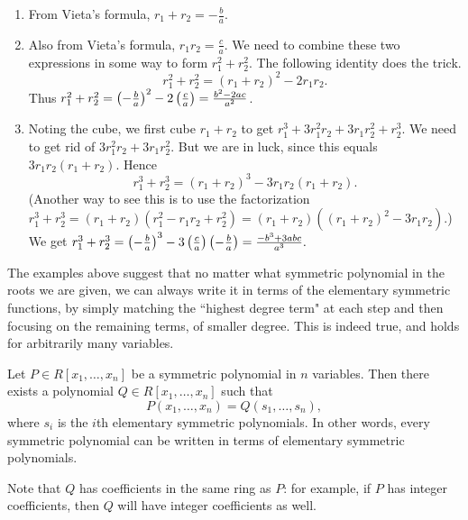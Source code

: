 \begin{enumerate}
\item
From Vieta's formula, $r_1+r_2=-\frac{b}{a}$.
\item Also from Vieta's formula, $r_1r_2=\frac{c}{a}$. We need to combine these two expressions in some way to form $r_1^2+r_2^2$. The following identity does the trick.
\[r_1^2+r_2^2=(r_1+r_2)^2-2r_1r_2.\]
Thus $r_1^2+r_2^2=\left( {-\frac ba} \right)^2-2\left( {\frac{c}{a}} \right)=\frac{b^2-2ac}{a^2}$.
\item Noting the cube, we first cube $r_1+r_2$ to get $r_1^3+3r_1^2r_2+3r_1r_2^2+r_2^3$. We need to get rid of $3r_1^2r_2+3r_1r_2^2$. But we are in luck, since this equals $3r_1r_2(r_1+r_2)$. Hence
\[
r_1^3+r_2^3=(r_1+r_2)^3-3r_1r_2(r_1+r_2).
\]
(Another way to see this is to use the factorization $r_1^3+r_2^3=(r_1+r_2)(r_1^2-r_1r_2+r_2^2)=(r_1+r_2)((r_1+r_2)^2-3r_1r_2)$.) 
We get $r_1^3+r_2^3=\left( {-\frac ba} \right)^3-3\left( {\frac{c}{a}} \right)\left( {-\frac ba} \right)=\frac{-b^3+3abc}{a^3}.$
\end{enumerate}
The examples above suggest that no matter what symmetric polynomial in the roots we are given, we can always write it in terms of the elementary symmetric functions, by simply matching the ``highest degree term" at each step and then focusing on the remaining terms, of smaller degree. This is indeed true, and holds for arbitrarily many variables. 
\begin{thm}
Let $P\in R[x_1,\ldots, x_n]$ be a symmetric polynomial in $n$ variables. Then there exists a polynomial $Q\in R[x_1,\ldots, x_n]$ such that
\[P(x_1,\ldots, x_n)=Q(s_1,\ldots, s_n),\]
where $s_i$ is the $i$th elementary symmetric polynomials. In other words, every symmetric polynomial can be written in terms of elementary symmetric polynomials.
\end{thm}
Note that $Q$ has coefficients in the same ring as $P$: for example, if $P$ has integer coefficients, then $Q$ will have integer coefficients as well.

